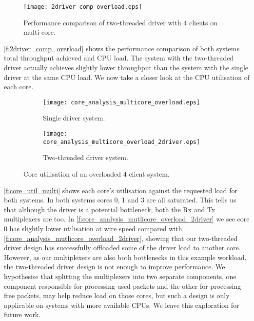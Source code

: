 \begin{figure}[h]
    \centering
    \texttt{[image: 2driver\_comp\_overload.eps]}
    \caption{Performance comparison of two-threaded driver with 4 clients on multi-core.}
    \label{f:2driver_comp_overload}
\end{figure}

\autoref{f:2driver_comp_overload} shows the performance comparison of both systems total throughput achieved and CPU load. 
The system with the two-threaded driver actually achieves slightly lower throughput than the system with the single driver
at the same CPU load. We now take a closer look at the CPU utilisation of each core.

\noindent\begin{figure}[H]
    \centering
	\begin{multicols}{2}
	\begin{subfigure}[b]{0.45\textwidth}
        \centering
        \texttt{[image: core\_analysis\_multicore\_overload.eps]}
        \caption{Single driver system.}
        \label{f:core_analysis_mutlicore_overload}
    \end{subfigure}\qquad
    \begin{subfigure}[b]{0.45\textwidth}
        \centering
        \texttt{[image: core\_analysis\_multicore\_overload\_2driver.eps]}
        \caption{Two-threaded driver system.}
        \label{f:core_analysis_mutlicore_overload_2driver}
    \end{subfigure}
\end{multicols}
\caption{Core utilisation of an overloaded 4 client system.}
\label{f:core_util_multi}
\end{figure}

\autoref{f:core_util_multi} shows each core's utilisation against the requested load for both systems. 
In both systems cores 0, 1 and 3 are all saturated. This tells us that although the driver is a potential
bottleneck, both the Rx and Tx multiplexers are too. In \autoref{f:core_analysis_mutlicore_overload_2driver}
we see core 0 has slightly lower utilisation at wire speed compared with
\autoref{f:core_analysis_mutlicore_overload_2driver}, showing that our two-threaded driver design has successfully
offloaded some of the driver load to another core. However, as our multiplexers are also both bottlenecks in 
this example workload, the two-threaded driver design is not enough to improve performance. We hypothesise that
splitting the multiplexers into two separate components, one component responsible for processing used packets and 
the other for processing free packets, may help reduce load on those cores, but such a design is only applicable
on systems with more available CPUs. We leave this exploration for future work.

